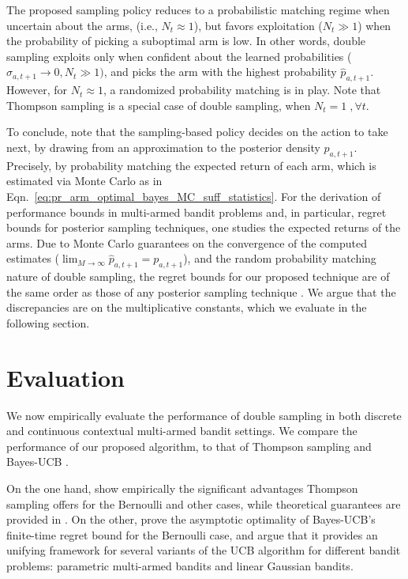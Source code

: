\documentclass{article}
\newcommand{\ie}{i.e., }
\begin{document}
The proposed sampling policy reduces to a probabilistic matching regime when uncertain about the arms, (\ie $N_t \approx 1$), but favors exploitation ($N_t \gg 1$) when the probability of picking a suboptimal arm is low. In other words, double sampling exploits only when confident about the learned probabilities ($\hat{\sigma}_{a,t+1} \rightarrow 0, N_t \gg 1)$, and picks the arm with the highest probability $\hat{p}_{a,t+1}$. However, for $N_t \approx 1$, a randomized probability matching is in play. Note that Thompson sampling is a special case of double sampling, when $N_{t}=1 \;, \forall t$.

To conclude, note that the sampling-based policy decides on the action to take next, by drawing from an approximation to the posterior density $p_{a,t+1}$. Precisely, by probability matching the expected return of each arm, which is estimated via Monte Carlo as in Eqn.~\eqref{eq:pr_arm_optimal_bayes_MC_suff_statistics}. For the derivation of performance bounds in multi-armed bandit problems and, in particular, regret bounds for posterior sampling techniques, one studies the expected returns of the arms. Due to Monte Carlo guarantees on the convergence of the computed estimates ($\lim_{M \to \infty} \hat{p}_{a,t+1} = p_{a,t+1}$), and the random probability matching nature of double sampling, the regret bounds for our proposed technique are of the same order as those of any posterior sampling technique \cite{j-Agrawal2012a,j-Russo2016}. We argue that the discrepancies are on the multiplicative constants, which we evaluate in the following section.



\section{Evaluation}
\label{sec:evaluation}

We now empirically evaluate the performance of double sampling in both discrete and continuous contextual multi-armed bandit settings. We compare the performance of our proposed algorithm, to that of Thompson sampling \cite{ic-Chapelle2011} and Bayes-UCB \cite{ip-Kaufmann2012}.

On the one hand, \cite{ic-Chapelle2011} show empirically the significant advantages Thompson sampling offers for the Bernoulli and other cases, while theoretical guarantees are provided in \cite{j-Agrawal2012,j-Agrawal2012a,ic-Korda2013,j-Russo2014,j-Russo2016}. On the other, \cite{ip-Kaufmann2012} prove the asymptotic optimality of Bayes-UCB's finite-time regret bound for the Bernoulli case, and argue that it provides an unifying framework for several variants of the UCB algorithm for different bandit problems: parametric multi-armed bandits and linear Gaussian bandits.
\end{document}
